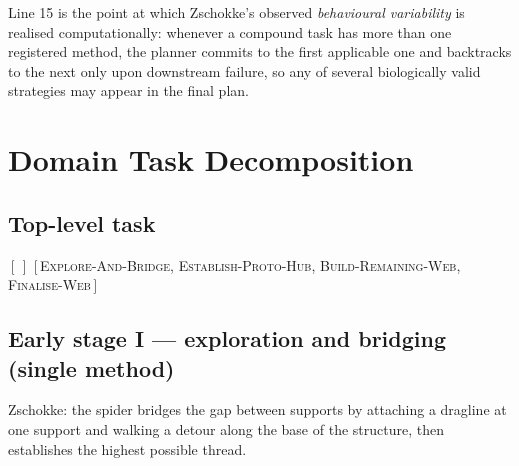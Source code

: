 Line 15 is the point at which Zschokke's observed \textit{behavioural variability} is realised computationally: whenever a compound task has more than one registered method, the planner commits to the first applicable one and backtracks to the next only upon downstream failure, so any of several biologically valid strategies may appear in the final plan.

\section{Domain Task Decomposition}
\label{sec:orig-domain}

\subsection{Top-level task}
\label{sec:orig-toplevel}

\begin{algorithm}[H]
\caption{Method for \textsc{Build-Web}}
\label{alg:orig-buildweb}
\begin{algorithmic}[1]
    \State \Return $[\,]$
  \EndIf
  \State \Return $[\,$\textsc{Explore-And-Bridge}, \textsc{Establish-Proto-Hub},\newline
    \hspace*{90pt}\textsc{Build-Remaining-Web}, \textsc{Finalise-Web}$\,]$
\EndFunction
\end{algorithmic}
\end{algorithm}

\subsection{Early stage I --- exploration and bridging (single method)}
\label{sec:orig-explore}

Zschokke: the spider bridges the gap between supports by attaching a dragline at one support and walking a detour along the base of the structure, then establishes the highest possible thread.

